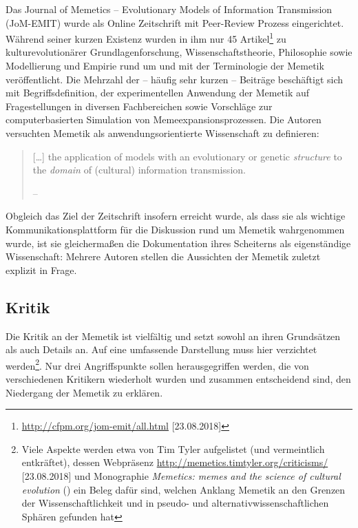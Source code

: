 \documentclass[openany,twoside,twocolumn]{book}
\let\rmarkdownfootnote\footnote%
\def\footnote{\protect\rmarkdownfootnote}
\begin{document}
Das Journal of Memetics -- Evolutionary Models of Information Transmission (JoM-EMIT) wurde als Online Zeitschrift mit Peer-Review Prozess eingerichtet. Während seiner kurzen Existenz wurden in ihm nur 45 Artikel\footnote{\url{http://cfpm.org/jom-emit/all.html} {[}23.08.2018{]}} zu kulturevolutionärer Grundlagenforschung, Wissenschaftstheorie, Philosophie sowie Modellierung und Empirie rund um und mit der Terminologie der Memetik veröffentlicht. Die Mehrzahl der -- häufig sehr kurzen -- Beiträge beschäftigt sich mit Begriffsdefinition, der experimentellen Anwendung der Memetik auf Fragestellungen in diversen Fachbereichen sowie Vorschläge zur computerbasierten Simulation von Memeexpansionsprozessen. Die Autoren versuchten Memetik als anwendungsorientierte Wissenschaft zu definieren:

\begin{quote}
{[}\ldots{}{]} the application of models with an evolutionary or genetic \emph{structure} to the \emph{domain} of (cultural) information transmission.

-- \textcite{edmonds_modelling_1998}
\end{quote}

Obgleich das Ziel der Zeitschrift insofern erreicht wurde, als dass sie als wichtige Kommunikationsplattform für die Diskussion rund um Memetik wahrgenommen wurde, ist sie gleichermaßen die Dokumentation ihres Scheiterns als eigenständige Wissenschaft: Mehrere Autoren stellen die Aussichten der Memetik zuletzt explizit in Frage.

\hypertarget{memetics-critique}{%
\subsection{Kritik}\label{memetics-critique}}

Die Kritik an der Memetik ist vielfältig und setzt sowohl an ihren Grundsätzen als auch Details an. Auf eine umfassende Darstellung muss hier verzichtet werden\footnote{Viele Aspekte werden etwa von Tim Tyler aufgelistet (und vermeintlich entkräftet), dessen Webpräsenz \url{http://memetics.timtyler.org/criticisms/} {[}23.08.2018{]} und Monographie \emph{Memetics: memes and the science of cultural evolution} (\textcite{tyler_memetics_2011}) ein Beleg dafür sind, welchen Anklang Memetik an den Grenzen der Wissenschaftlichkeit und in pseudo- und alternativwissenschaftlichen Sphären gefunden hat}. Nur drei Angriffspunkte sollen herausgegriffen werden, die von verschiedenen Kritikern wiederholt wurden und zusammen entscheidend sind, den Niedergang der Memetik zu erklären.
\end{document}
